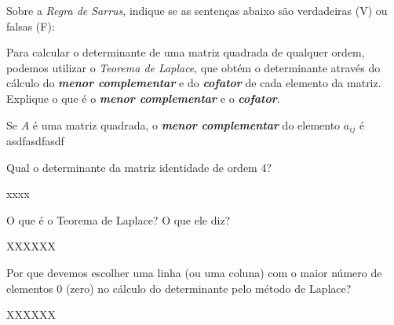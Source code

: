 \documentclass[pdftex, brazil, 12pt, oneside, addpoints]{exam}
\newcommand{\vf}[1][{}]{%
  \fillin[#1][0.25in]%
}
\begin{document}
\begin{questions}
\question
Sobre a \emph{Regra de Sarrus}, indique se as sentenças abaixo
são verdadeiras (V) ou falsas (F):

\question
Para calcular o determinante de uma matriz quadrada de qualquer ordem, podemos
utilizar o \emph{Teorema de Laplace}, que obtém o determinante através do cálculo
do \emph{\textbf{menor complementar}} e do \emph{\textbf{cofator}} de cada elemento
da matriz. Explique o que é o \emph{\textbf{menor complementar}} e o
\emph{\textbf{cofator}}.
\begin{solutionorlines}[1.00in]
  Se $A$ é uma matriz quadrada, o \emph{\textbf{menor complementar}} do elemento $a_{ij}$
  é asdfasdfasdf
\end{solutionorlines}

\question
Qual o determinante da matriz identidade de ordem 4?
\begin{solutionorlines}[0.25in]
  xxxx
\end{solutionorlines}

\question
O que é o Teorema de Laplace? O que ele diz?
\begin{solutionorlines}[0.75in]
  XXXXXX
\end{solutionorlines}

\question
Por que devemos escolher uma linha (ou  uma coluna) com o maior número
de elementos 0 (zero) no cálculo do determinante pelo método de
Laplace?
\begin{solutionorlines}[0.50in]
  XXXXXX
\end{solutionorlines}


\end{questions}
\end{document}
